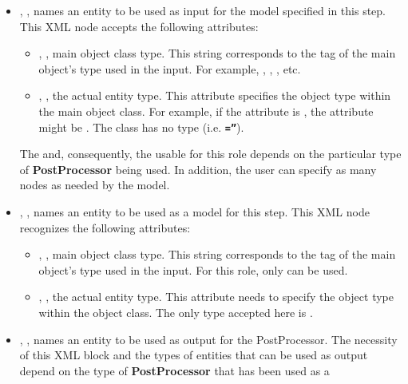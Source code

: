 \begin{itemize}
\item {}, , names an entity to
  be used as input for the model specified in this step.
  This XML node accepts the following attributes:
\begin{itemize}
  \item {}, , main object class
    type.
    This string corresponds to the tag of the main object's type used in the
    input.
    For example, , , ,
    etc.
  \item {}, , the actual entity
    type.
    This attribute specifies the object type within the main object class.
    For example, if the   attribute is , 
    the  attribute might be . 
    \nb The class  has no type (i.e.
    \textbf{\texttt{=''}}).
\end{itemize}
\nb The  and, consequently,  the  usable for this
role depends on the particular type of \textbf{PostProcessor} being used.
In addition, the user can specify as many  nodes as needed by the
model.
\item {}, , names an entity to
be used as a model for this step.
This XML node recognizes the following attributes:
\begin{itemize}
  \item {}, , main object class
    type.
    This string corresponds to the tag of the main object's type used in the
    input.
    For this role, only  can be used.
  \item {}, , the actual entity
    type.
    This attribute needs to specify the object type within the
     object class.
    The only type accepted here is .
\end{itemize}
\item {}, , names an
  entity to be used as output for the PostProcessor.
  The necessity of this XML block and the types of entities that can be used as
  output depend on the type of \textbf{PostProcessor} that has been used as a

\end{itemize}
